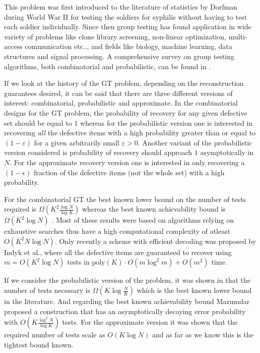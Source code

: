\documentclass[conference,twocolumn]{IEEEtran}
\begin{document}
This problem was first introduced to the literature of statistics by Dorfman \cite{dorfman1943detection} during World War II for testing the soldiers for syphilis without having to test each soldier individually. Since then group testing has found application in wide variety of problems like clone library screening, non-linear optimization, multi-access communication etc.., \cite{du1999combinatorial} and fields like biology\cite{chen2008survey}, machine learning\cite{malioutov2013exact}, data structures\cite{goodrich2005indexing} and signal processing\cite{emad2014poisson}. A comprehensive survey on group testing algorithms, both combinatorial and probabilistic, can be found in \cite{du1999combinatorial,chan2014non,atia2012boolean}. 

If we look at the history of the GT problem, depending on the reconstruction guarantees desired, it can be said that there are three different versions of interest: combinatorial, probabilistic and approximate. In the combinatorial designs for the GT problem, the probability of recovery for any given defective set should be equal to $1$ whereas for the probabilistic version one is interested in recovering \textit{all} the defective items with a high probability greater than or equal to $(1-\varepsilon)$ for a given arbitrarily small $\varepsilon>0$. Another variant of the probabilistic version considered is probability of recovery should approach $1$ asymptotically in $N$. For the approximate recovery version one is interested in only recovering a $(1-\epsilon)$ fraction of the defective items (not the whole set) with a high probability.

For the combinatorial GT the best known lower bound on the number of tests required is $\Omega(K^2\frac{\log N}{\log K})$ \cite{d1982bounds,erdos1985families} whereas the best known achievability bound is $\Omega(K^2 \log N)$ \cite{kautz1964nonrandom,porat2011explicit}. Most of these results were based on algorithms relying on exhaustive searches thus have a high computational complexity of atleast $O(K^2 N\log N)$. Only recently a scheme with efficient decoding was proposed by Indyk et al., \cite{indyk2010efficiently} where all the defective items are guaranteed to recover using $m=O(K^2\log N)$ tests in $\text{poly}(K)\cdot O(m \log^2 m )+O(m^2)$ time. 

If we consider the probabilistic version of the problem, it was shown in \cite{chan2014non,atia2012boolean} that the number of tests
necessary is $\Omega(K\log \frac{N}{K})$ which is the best known lower bound in the literature. And regarding the best known achievability bound Mazumdar \cite{mazumdar2015nonadaptive} proposed a construction that has an asymptotically decaying error probability with $O(K\frac{\log^2 N}{\log K})$ tests. For the approximate version it was shown \cite{atia2012boolean} that the required number of tests scale as $O(K\log N)$ and as far as we know this is the tightest bound known.
\end{document}
